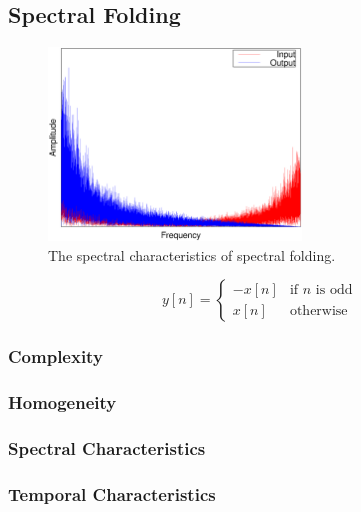 	\subsection{Spectral Folding}
	\label{sec:Excitation-SpectralFolding}
	
		\begin{figure}[h!]
			\centering
			\includegraphics[width=0.6\textwidth]{chapter3/Images/SpectralFoldingSpectrum.eps}
			\caption{The spectral characteristics of spectral folding.}
			\label{fig:SpectralFolding}
		\end{figure}

		\begin{equation}
			y[n] = \begin{cases}
				-x[n] & \text{if $n$ is odd} \\
				x[n] & \text{otherwise}
			\end{cases}
			\label{eq:SpectralFolding}
		\end{equation}

		\subsubsection*{Complexity}
		\subsubsection*{Homogeneity}
		\subsubsection*{Spectral Characteristics}
		\subsubsection*{Temporal Characteristics}

